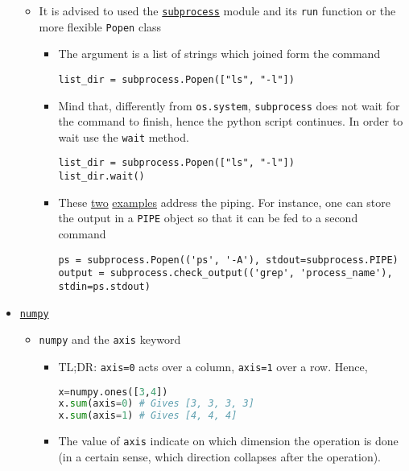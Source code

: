 \documentclass[a4paper,12pt,%
              final%
              ]{article}
\begin{document}
\begin{itemize}
\begin{itemize}
      \item It is advised to used the \href{https://docs.python.org/3/library/subprocess.html#subprocess.Popen.communicate}{\texttt{subprocess}} module and its \texttt{run} function or the more flexible \texttt{Popen} class
        \begin{itemize}
          \item The argument is a list of strings which joined form the command
\begin{verbatim}
list_dir = subprocess.Popen(["ls", "-l"])
\end{verbatim}
          \item Mind that, differently from \verb|os.system|, \texttt{subprocess} does not wait for the command to finish, hence the python script continues. In order to wait use the \texttt{wait} method.
\begin{verbatim}
list_dir = subprocess.Popen(["ls", "-l"])
list_dir.wait()
\end{verbatim}
          \item These \href{https://stackoverflow.com/questions/13332268/how-to-use-subprocess-command-with-pipes}{two} \href{https://stackoverflow.com/questions/295459/how-do-i-use-subprocess-popen-to-connect-multiple-processes-by-pipes}{examples} address the piping. For instance, one can store the output in a \texttt{PIPE} object so that it can be fed to a second command
\begin{verbatim}
ps = subprocess.Popen(('ps', '-A'), stdout=subprocess.PIPE)
output = subprocess.check_output(('grep', 'process_name'), stdin=ps.stdout)
\end{verbatim}
        \end{itemize}
    \end{itemize}
  \item \href{https://numpy.org/doc/stable/index.html}{\texttt{numpy}}
    \begin{itemize}
      \item \texttt{numpy} and the \texttt{axis} keyword
        \begin{itemize}
          \item TL;DR: \verb|axis=0| acts over a column, \verb|axis=1| over a row. Hence,
\begin{lstlisting}[language=python]
x=numpy.ones([3,4])
x.sum(axis=0) # Gives [3, 3, 3, 3]
x.sum(axis=1) # Gives [4, 4, 4]
\end{lstlisting}
          \item The value of \texttt{axis} indicate on which dimension the operation is done (in a certain sense, which direction collapses after the operation).

\end{itemize}
\end{itemize}
\end{itemize}
\end{document}
